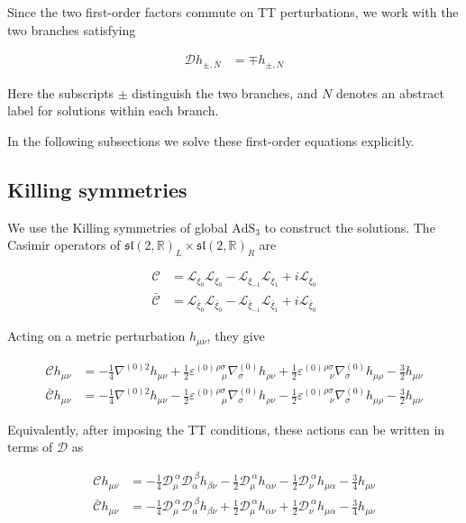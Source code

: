 Since the two first-order factors commute on TT perturbations, we work with the two branches satisfying

\begin{align}
\mathcal{D}h_{\pm,N} & =\mp h_{\pm,N}
\end{align}

Here the subscripts \(\pm\) distinguish the two branches, and \(N\) denotes an abstract label for solutions within each branch.

In the following subsections we solve these first-order equations explicitly.

\subsection{Killing symmetries}\label{killing-symmetries}

We use the Killing symmetries of global \(\mathrm{AdS}_{3}\) to construct the solutions. The Casimir operators of \(\mathfrak{sl}(2,\mathbb{R})_{L}\times \mathfrak{sl}(2,\mathbb{R})_{R}\) are

\begin{align}
\mathcal{C} & =\mathcal{L}_{\xi_{0}}\mathcal{L}_{\xi_{0}}-\mathcal{L}_{\xi _{-1}}\mathcal{L}_{\xi _{1}}+i\mathcal{L}_{\xi_{0}} \\
\mathcal{\bar{C}} & =\mathcal{L}_{\bar{\xi}_{0}}\mathcal{L}_{\bar{\xi}_{0}}-\mathcal{L}_{\bar{\xi}_{-1}}\mathcal{L}_{\bar{\xi}_{1}}+i\mathcal{L}_{\bar{\xi}_{0}}
\end{align}

Acting on a metric perturbation \(h_{\mu \nu}\), they give

\begin{align}
\mathcal{C}h_{\mu \nu} & =-\frac{1}{4}\nabla ^{(0)2}h_{\mu \nu}+\frac{1}{2}\varepsilon^{(0)}{} ^{\rho \sigma}_{~~~\mu}\nabla ^{(0)}_{\sigma}h_{\rho \nu}+\frac{1}{2}\varepsilon^{(0)}{} ^{\rho \sigma}_{~~~\nu}\nabla ^{(0)}_{\sigma}h_{\mu \rho}-\frac{3}{2}h_{\mu \nu} \\
\mathcal{\bar{C}}h_{\mu \nu} & =-\frac{1}{4}\nabla ^{(0)2}h_{\mu \nu}-\frac{1}{2}\varepsilon^{(0)}{} ^{\rho \sigma}_{~~~\mu}\nabla ^{(0)}_{\sigma}h_{\rho \nu}-\frac{1}{2}\varepsilon^{(0)}{} ^{\rho \sigma}_{~~~\nu}\nabla ^{(0)}_{\sigma}h_{\mu \rho}-\frac{3}{2}h_{\mu \nu}
\end{align}

Equivalently, after imposing the TT conditions, these actions can be written in terms of \(\mathcal{D}\) as

\begin{align}
\mathcal{C}h_{\mu \nu} & =-\frac{1}{4}\mathcal{D}_{\mu}^{~\alpha}\mathcal{D}_{\alpha}^{~\beta}h_{\beta \nu}-\frac{1}{2}\mathcal{D}_{\mu}^{~\alpha}h_{\alpha \nu}-\frac{1}{2}\mathcal{D}_{\nu}^{~\alpha}h_{\mu \alpha}-\frac{3}{4}h_{\mu \nu} \\
\mathcal{\bar{C}}h_{\mu \nu} & =-\frac{1}{4}\mathcal{D}_{\mu}^{~\alpha}\mathcal{D}_{\alpha}^{~\beta}h_{\beta \nu}+\frac{1}{2}\mathcal{D}_{\mu}^{~\alpha}h_{\alpha \nu}+\frac{1}{2}\mathcal{D}_{\nu}^{~\alpha}h_{\mu \alpha}-\frac{3}{4}h_{\mu \nu}
\end{align}

